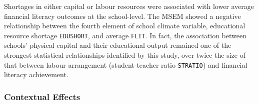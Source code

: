 Shortages in either capital or labour resources were associated with lower average financial literacy outcomes at the school-level. The MSEM showed a negative relationship between the fourth element of school climate variable, educational resource shortage \texttt{EDUSHORT}, and average \texttt{FLIT}. In fact, the association between schools' physical capital and their educational output remained one of the strongest statistical relationships identified by this study, over twice the size of that between labour arrangement (student-teacher ratio \texttt{STRATIO}) and financial literacy achievement.

\subsubsection{Contextual Effects}

